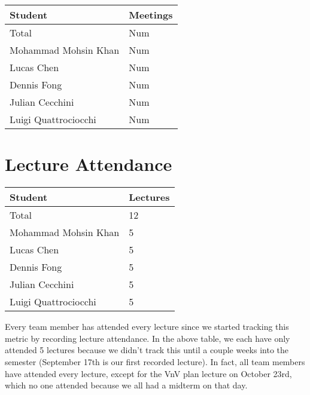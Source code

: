 \documentclass{article}
\begin{document}
\begin{table}[H]
\centering
\begin{tabular}{ll}
\toprule
\textbf{Student} & \textbf{Meetings}\\
\midrule
Total & Num\\
Mohammad Mohsin Khan & Num\\
Lucas Chen & Num\\
Dennis Fong & Num\\
Julian Cecchini & Num\\
Luigi Quattrociocchi & Num\\
\bottomrule
\end{tabular}
\end{table}


\section{Lecture Attendance}


\begin{table}[H]
\centering
\begin{tabular}{ll}
\toprule
\textbf{Student} & \textbf{Lectures}\\
\midrule
Total & 12\\
Mohammad Mohsin Khan & 5\\
Lucas Chen & 5\\
Dennis Fong & 5\\
Julian Cecchini & 5\\
Luigi Quattrociocchi & 5\\
\bottomrule
\end{tabular}
\end{table}

Every team member has attended every lecture since we started tracking
this metric by recording lecture attendance. In the above table, we each
have only attended 5 lectures because we didn't track this until a couple
weeks into the semester (September 17th is our first recorded lecture).
In fact, all team members have attended every lecture, except for the
VnV plan lecture on October 23rd, which no one attended because we all
had a midterm on that day.
\end{document}
